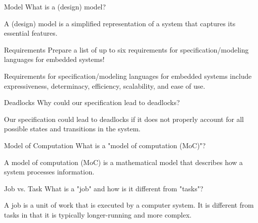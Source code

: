 \documentclass{article}
\begin{document}

\begin{exercise}{Model}
  What is a (design) model?

  \begin{solution}
    A (design) model is a simplified representation of a system that captures its essential features.
  \end{solution}
\end{exercise}

\begin{exercise}{Requirements}
  Prepare a list of up to six requirements for specification/modeling languages for embedded systems!

  \begin{solution}
    Requirements for specification/modeling languages for embedded systems include expressiveness, determinacy, efficiency, scalability, and ease of use.
  \end{solution}
\end{exercise}

\begin{exercise}{Deadlocks}
  Why could our specification lead to deadlocks?

  \begin{solution}
    Our specification could lead to deadlocks if it does not properly account for all possible states and transitions in the system.
  \end{solution}
\end{exercise}

\begin{exercise}{Model of Computation}
  What is a "model of computation (MoC)"?

  \begin{solution}
    A model of computation (MoC) is a mathematical model that describes how a system processes information.
  \end{solution}
\end{exercise}

\begin{exercise}{Job vs. Task}
  What is a "job" and how is it different from "tasks"?

  \begin{solution}
    A job is a unit of work that is executed by a computer system. It is different from tasks in that it is typically longer-running and more complex.
  \end{solution}
\end{exercise}
\end{document}
